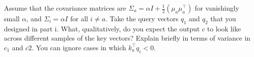 \begin{parts}
\begin{subparts}
\subpart[2]
Assume that the covariance matrices are $\Sigma_a=\alpha I + \frac{1}{2}(\mu_a\mu_a^\top)$ for vanishingly small $\alpha$, and $\Sigma_i=\alpha I$  for all $i \neq a$.
Take the query vectors $q_1$ and $q_2$ that you designed in part i.
What, qualitatively, do you expect the output $c$ to look like across different samples of the key vectors? Explain briefly in terms of variance in $c_1$ and $c2$. You can ignore cases in which $k_a^\top q_i < 0$. 


\end{subparts}


\end{parts}

